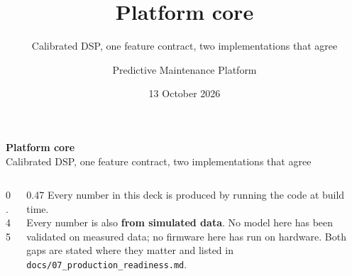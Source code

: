 \documentclass[aspectratio=169,10pt]{beamer}
\title[Platform core]{Platform core}
\subtitle{Calibrated DSP, one feature contract, two implementations that agree}
\author{Predictive Maintenance Platform}
\date{13 October 2026}
\begin{document}
\begin{frame}[plain]
  \vspace{5mm}
  {\LARGE\bfseries Platform core}\\[2mm]
  {\large\color{pdmink2} Calibrated DSP, one feature contract, two
    implementations that agree}\par
  \vspace{5mm}\noindent{\color{pdmrule}\rule{\linewidth}{0.4pt}}\par
  \vspace{3mm}
  \begin{columns}[T]
    \begin{column}{0.45\textwidth}
      \scriptsize
      \\[1mm]
      \\[1mm]
      \\[1mm]
      \\[1mm]
      \\[1mm]
    \end{column}
    \begin{column}{0.47\textwidth}
      \scriptsize\color{pdmink2}
      Every number in this deck is produced by running the code at build time.
      \\[2mm]
      Every number is also \textbf{from simulated data}. No model here has been
      validated on measured data; no firmware here has run on hardware. Both
      gaps are stated where they matter and listed in
      \texttt{docs/07\_production\_readiness.md}.
    \end{column}
  \end{columns}
\end{frame}
\end{document}
